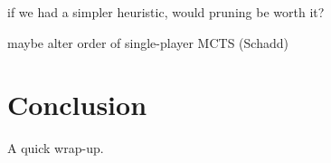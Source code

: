 \documentclass[letterpaper]{article}
\begin{document}
if we had a simpler heuristic, would pruning be worth it?

maybe alter order of single-player MCTS (Schadd)


\section{Conclusion}

A quick wrap-up.

%
%
%
%
%
\end{document}

